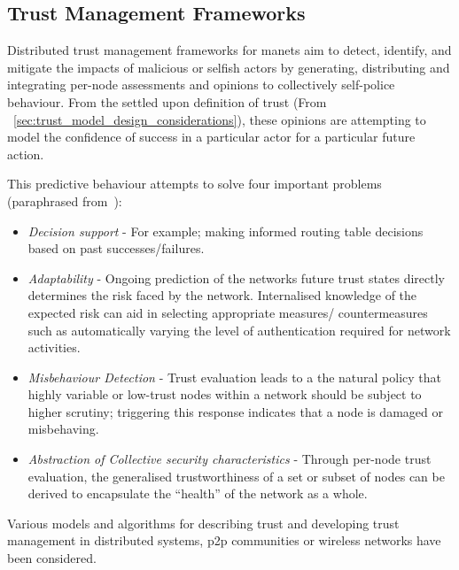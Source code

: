 \subsection{Trust Management Frameworks}\label{sec:tmfs}

Distributed trust management frameworks for \glspl{manet} aim to detect, identify, and mitigate the impacts of malicious or selfish actors by generating, distributing and integrating per-node assessments and opinions to collectively self-police behaviour.
From the settled upon definition of trust (From ~\autoref{sec:trust_model_design_considerations}), these opinions are attempting to model the confidence of success in a particular actor for a particular future action.

This predictive behaviour attempts to solve four important problems (paraphrased from~\cite{Sun2008}):
\begin{itemize}
  \item \emph{Decision support} - For example; making informed routing table decisions based on past successes/failures.
  \item \emph{Adaptability} - Ongoing prediction of the networks future trust states directly determines the risk faced by the network. Internalised knowledge of the expected risk can aid in selecting appropriate measures/ countermeasures such as automatically varying the level of authentication required for network activities.
  \item \emph{Misbehaviour Detection} - Trust evaluation leads to a the natural policy that highly variable or low-trust nodes within a network should be subject to higher scrutiny; triggering this response indicates that a node is damaged or misbehaving.
  \item \emph{Abstraction of Collective security characteristics} - Through per-node trust evaluation, the generalised trustworthiness of a set or subset of nodes can be derived to encapsulate the ``health'' of the network as a whole.
\end{itemize}

\vspace{\baselineskip}

Various models and algorithms for describing trust and developing trust management in distributed systems, \gls{p2p} communities or wireless networks have been considered.


